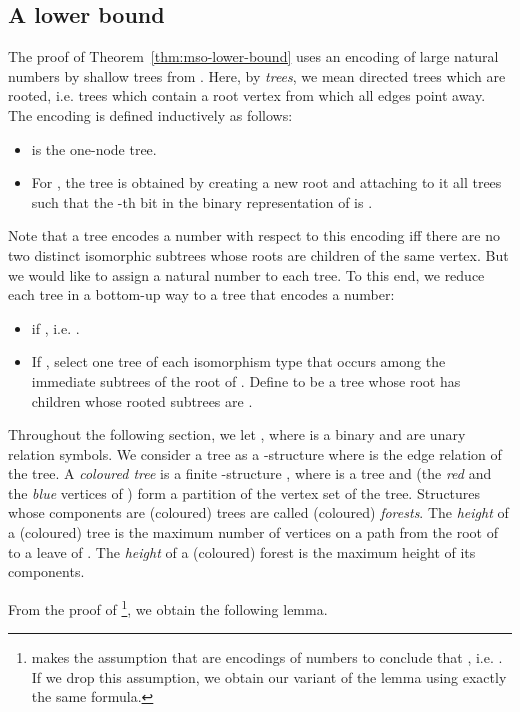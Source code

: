 \documentclass[11pt]{article}
\begin{document}
\subsection{A lower bound}
\label{sec:lower-bounds}

The proof of Theorem~\ref{thm:mso-lower-bound} uses an encoding of large natural
numbers  by shallow trees  from \cite[chapter 10.3]{FlumGrohe2004}.
Here, by \emph{trees}, we mean directed trees which are rooted, i.e. trees which
contain a root vertex from which all edges point away.  The encoding is defined
inductively as follows:
\begin{itemize}
\item  is the one-node tree.
\item For , the tree  is obtained by creating a new
  root and attaching to it all trees  such that the -th
  bit in the binary representation of  is .
\end{itemize}
Note that a tree encodes a number with respect to this encoding iff there are no
two distinct isomorphic subtrees whose roots are children of the same
vertex. But we would like to assign a natural number to each tree. To this end,
we reduce each tree  in a bottom-up way to a tree  that encodes
a number:
\begin{itemize}
\item  if , i.e. .
\item If , select one tree  of each
  isomorphism type that occurs among the immediate subtrees of the root of
  . Define  to be a tree whose root has children whose rooted
  subtrees are .  
\end{itemize}
Throughout the following section, we let , where  is a
binary and  are unary relation symbols.  We consider a tree as a
-structure  where  is the edge relation of the tree.  A
\emph{coloured tree} is a finite -structure , where
 is a tree and  (the \emph{red} and the \emph{blue} vertices
of ) form a partition of the vertex set of the tree.  Structures whose
components are (coloured) trees are called (coloured) \emph{forests}.  The
\emph{height}  of a (coloured) tree  is the maximum number of
vertices on a path from the root of  to a leave of .  The
\emph{height}  of a (coloured) forest  is the maximum height
of its components.

From the proof of \cite[Lemma~10.21]{FlumGrohe2004}\footnote{\cite[Lemma~10.21]{FlumGrohe2004}
  makes the assumption that  are encodings of
  numbers  to conclude that , i.e. . If we drop this assumption, we
  obtain our variant of the lemma using exactly the same formula.}, we
obtain the following lemma.
\end{document}
